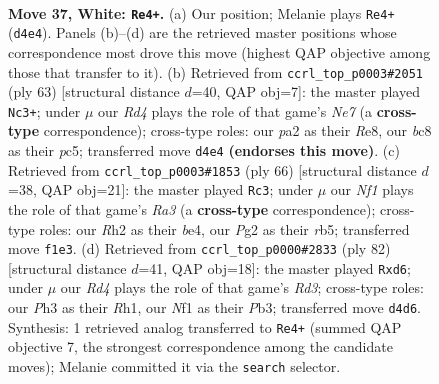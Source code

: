 \documentclass[11pt]{article}
\begin{document}
\clearpage

\begin{figure}[p]\centering
\begin{subfigure}{0.46\textwidth}\centering
\resizebox{\linewidth}{!}{%
\newchessgame
\chessboard[
  setfen={r1b1k3/8/8/1r6/2nR3p/7P/p5PR/K4N2 w q - 0 37},
  showmover=false,
  pgfstyle=straightmove, color=movearrow, markmove={d4-e4}
]}
\caption{}
\end{subfigure}\hfill
\begin{subfigure}{0.46\textwidth}\centering
\resizebox{\linewidth}{!}{%
\newchessgame
\chessboard[
  setfen={2k1r3/2p2R2/p7/1pP3R1/8/4P1B1/r3n2P/1K6 b - - 7 32},
  showmover=false,
  pgfstyle=straightmove, color=movearrow, markmove={e2-c3}
]}
\caption{}
\end{subfigure}
\\[4pt]
\begin{subfigure}{0.46\textwidth}\centering
\resizebox{\linewidth}{!}{%
\newchessgame
\chessboard[
  setfen={2r3k1/2B2p2/P4R2/1r2p1Pp/4b2P/R7/8/4K3 w - - 3 34},
  showmover=false,
  pgfstyle=straightmove, color=movearrow, markmove={a3-c3}
]}
\caption{}
\end{subfigure}\hfill
\begin{subfigure}{0.46\textwidth}\centering
\resizebox{\linewidth}{!}{%
\newchessgame
\chessboard[
  setfen={6k1/6b1/2rrp3/Bp6/5P2/1P1R2p1/P5K1/7R w - - 0 42},
  showmover=false,
  pgfstyle=straightmove, color=movearrow, markmove={d3-d6}
]}
\caption{}
\end{subfigure}
\caption{\textbf{Move 37, White: \texttt{Re4+}.} (a) Our position; Melanie plays \texttt{Re4+} (\texttt{d4e4}). Panels (b)--(d) are the retrieved master positions whose correspondence most drove this move (highest QAP objective among those that transfer to it). (b) Retrieved from \texttt{ccrl\_top\_p0003\#2051} (ply 63) [structural distance $d$=40, QAP obj=7]: the master played \texttt{Nc3+}; under $\mu$ our \emph{Rd4} plays the role of that game's \emph{Ne7} (a \textbf{cross-type} correspondence); cross-type roles: our \emph{p}a2 as their \emph{R}e8, our \emph{b}c8 as their \emph{p}c5; transferred move \texttt{d4e4} \textbf{(endorses this move)}. (c) Retrieved from \texttt{ccrl\_top\_p0003\#1853} (ply 66) [structural distance $d$=38, QAP obj=21]: the master played \texttt{Rc3}; under $\mu$ our \emph{Nf1} plays the role of that game's \emph{Ra3} (a \textbf{cross-type} correspondence); cross-type roles: our \emph{R}h2 as their \emph{b}e4, our \emph{P}g2 as their \emph{r}b5; transferred move \texttt{f1e3}. (d) Retrieved from \texttt{ccrl\_top\_p0000\#2833} (ply 82) [structural distance $d$=41, QAP obj=18]: the master played \texttt{Rxd6}; under $\mu$ our \emph{Rd4} plays the role of that game's \emph{Rd3}; cross-type roles: our \emph{P}h3 as their \emph{R}h1, our \emph{N}f1 as their \emph{P}b3; transferred move \texttt{d4d6}. Synthesis: 1 retrieved analog transferred to \texttt{Re4+} (summed QAP objective 7, the strongest correspondence among the candidate moves); Melanie committed it via the \texttt{search} selector.}
\label{fig:thought-m72}
\end{figure}
\end{document}
